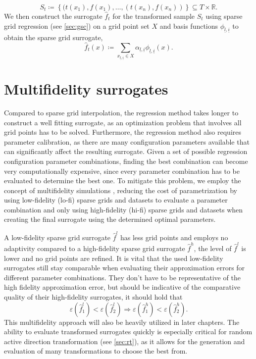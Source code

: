 \documentclass[
  a4paper,  %
  twoside,  %
  bibliography=totoc,
  headsepline,
  cleardoublepage=empty,
  parskip=half,
  draft=false
]{scrbook}
\begin{document}
\begin{equation}
S_t \coloneqq \left\{(t(x_1), f(x_1), \dots, (t(x_n), f(x_n))\right\} \subseteq T \times \mathds{R}.
\end{equation}
We then construct the surrogate $\hat{f}_t$ for the transformed sample $S_t$ using sparse grid regression (see \cref{sec:gsc}) on a grid point set $X$ and basis functions $\phi_{\underline{l},\underline{i}}$ to obtain the sparse grid surrogate,
\begin{equation}
\hat{f}_t(x) \coloneqq \sum_{x_{\underline{l},\underline{i}} \in X} \alpha_{\underline{l},\underline{i}} \phi_{\underline{l},\underline{i}}(x).
\end{equation}

\section{Multifidelity surrogates}
\label{sec:lofi}

Compared to sparse grid interpolation, the regression method takes longer to construct a well fitting surrogate, as an optimization problem that involves all grid points has to be solved.
Furthermore, the regression method also requires parameter calibration, as there are many configuration parameters available that can significantly affect the resulting surrogate.
Given a set of possible regression configuration parameter combinations, finding the best combination can become very computationally expensive, since every parameter combination has to be evaluated to determine the best one.
To mitigate this problem, we employ the concept of multifidelity simulations \cite{Robinson2006, Forrester2008}, \ie reducing the cost of parametrization by using low-fidelity (lo-fi) sparse grids and datasets to evaluate a parameter combination and only using high-fidelity (hi-fi) sparse grids and datasets when creating the final surrogate using the determined optimal parameters.

A low-fidelity sparse grid surrogate $\hat{f}^l$ has less grid points and employs no adaptivity compared to a high-fidelity sparse grid surrogate $\hat{f}^h$, \ie the level of $\hat{f}^l$ is lower and no grid points are refined.
It is vital that the used low-fidelity surrogates still stay comparable when evaluating their approximation errors for different parameter combinations.
They don't have to be representative of the high fidelity approximation error, but should be indicative of the comparative quality of their high-fidelity surrogates, \ie it should hold that
\begin{equation}
\varepsilon(\hat{f}_1^l) < \varepsilon(\hat{f}_2^l) \Rightarrow \varepsilon(\hat{f}_1^h) < \varepsilon(\hat{f}_2^h).
\end{equation}
%
This multifidelity approach will also be heavily utilized in later chapters.
The ability to evaluate transformed surrogates quickly is especially critical for random active direction transformation (see \cref{sec:rt}), as it allows for the generation and evaluation of many transformations to choose the best from.
\end{document}
